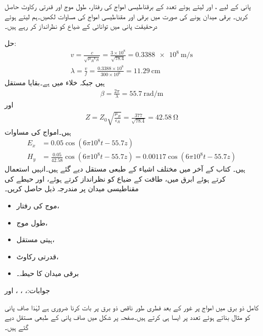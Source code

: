 پانی کے لیے ،  اور  لیتے ہوئے  تعدد کے برقناطیسی امواج کی رفتار، طول موج اور قدرتی رکاوٹ حاصل کریں۔ برقی میدان  ہونے کی صورت میں برقی اور مقناطیسی امواج کی مساوات لکھیں۔ہم  لیتے ہوئے درحقیقت پانی میں توانائی کے ضیاع کو نظرانداز کر رہے ہیں۔

حل:
\begin{align*}
v=\frac{c}{\sqrt{\mu_R \epsilon_R}}=\frac{3 \times 10^8}{\sqrt{78.4}}=\SI{0.3388e8}{\meter \per \second}\\
\lambda=\frac{v}{f}=\frac{0.3388 \times 10^8}{300 \times 10^6}=\SI{11.29}{\centi\meter}
\end{align*}
ہیں جبکہ خلاء میں  ہے۔بقایا مستقل
\begin{align*}
\beta=\frac{2\pi}{\lambda}=\SI{55.7}{\radian \per \meter}
\end{align*}
اور
\begin{align*}
Z=Z_0 \sqrt{\frac{\mu_R}{\epsilon_R}}=\frac{377}{\sqrt{78.4}}=\SI{42.58}{\ohm}
\end{align*}
ہیں۔امواج کی مساوات
\begin{align*}
E_x&=0.05 \cos (6\pi 10^8 t -55.7 z)\\
H_y&=\frac{0.05}{42.58} \cos (6\pi 10^8 t -55.7 z)=0.00117 \cos (6\pi 10^8 t -55.7 z)
\end{align*}
ہیں۔
کتاب کے آخر میں مختلف اشیاء کے طبعی مستقل دیے گئے ہیں۔انہیں استعمال کرتے ہوئے  ابرق میں، طاقت کے ضیاع کو نظرانداز کرتے ہوئے،   اور  حیطے  کی مقناطیسی میدان پر مندرجہ ذیل حاصل کریں۔
\begin{itemize}
\item
موج کی رفتار،
\item
طول موج،
\item
ہیتی مستقل،
\item
قدرتی رکاوٹ،
\item
برقی میدان کا حیطہ۔
\end{itemize} 

جوابات:، ، ،  اور 

کامل ذو برق میں امواج پر غور کے بعد فطری طور ناقص ذو برق پر بات کرنا ضروری ہے لہٰذا صاف پانی کو مثال بناتے ہوئے    تعدد پر  ایسا ہی کرتے ہیں۔صفحہ  پر شکل  میں صاف پانی کے طبعی مستقل دیے گئے ہیں۔

